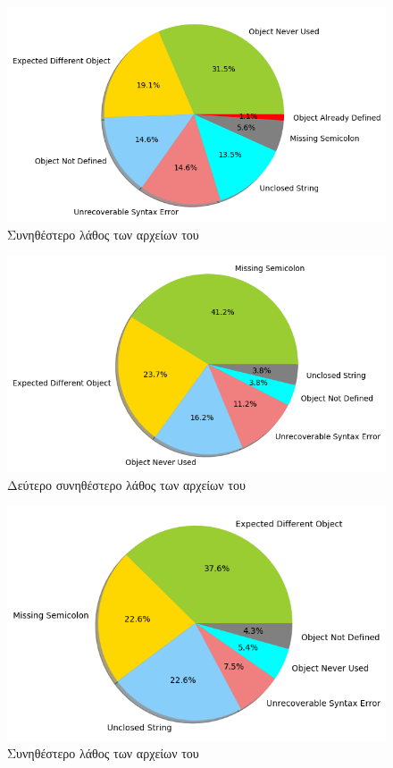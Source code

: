 \begin{figure}
	\includegraphics[width=\textwidth, keepaspectratio]{images/MCE-temp-char.png}
	\caption{Συνηθέστερο λάθος των αρχείων του }
	\label{MCE-temp-char}
\end{figure}

\begin{figure}
	\includegraphics[width=\textwidth, keepaspectratio]{images/MCE2-temp-char.png}
	\caption{Δεύτερο συνηθέστερο λάθος των αρχείων του }
	\label{MCE2-temp-char}
\end{figure}

\begin{figure}
	\includegraphics[width=\textwidth, keepaspectratio]{images/MCE-temp-labeled.png}
	\caption{Συνηθέστερο λάθος των αρχείων του }
	\label{MCE2-temp-labeled}
\end{figure}

